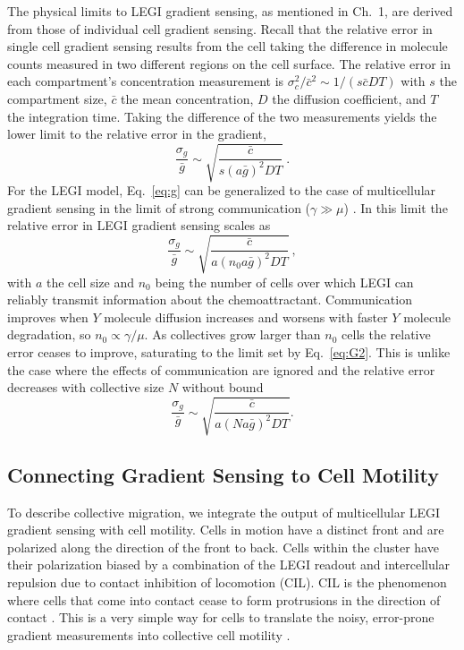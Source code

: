 The physical limits to LEGI gradient sensing, as mentioned in Ch.\ 1, are derived from those of individual cell gradient sensing. Recall that the relative error in single cell gradient sensing results from the cell taking the difference in molecule counts measured in two different regions on the cell surface. The relative error in each compartment’s concentration measurement is
$\sigma^2_c / \bar{c}^2 \sim 1 / (s\bar{c}DT)$
with $s$ the compartment size, $\bar{c}$ the mean concentration, $D$ the diffusion coefficient, and $T$ the integration time.
Taking the difference of the two measurements yields the lower limit to the relative error in the gradient,
\begin{equation} \label{eq:g}
    \frac{\sigma_g}{\bar{g}} \sim \sqrt{\frac{\bar{c}}{s(a\bar{g})^2DT}} \ .
\end{equation}
For the LEGI model, Eq.\ \ref{eq:g} can be generalized to the case of multicellular gradient sensing in the limit of strong communication ($\gamma \gg \mu$) \cite{mugler2016limits}.
In this limit the relative error in LEGI gradient sensing scales as
\begin{equation} \label{eq:G2}
    \frac{\sigma_g}{\bar{g}} \sim \sqrt{\frac{\bar{c}}{a(n_0a\bar{g})^2DT}} \ ,
\end{equation}
with $a$ the cell size and $n_0$ being the number of cells over which LEGI can reliably transmit information about the chemoattractant.
Communication improves when $Y$ molecule diffusion increases and worsens with faster $Y$ molecule degradation, so
$n_0 \propto \gamma / \mu$.
As collectives grow larger than $n_0$ cells the relative error ceases to improve, saturating to the limit set by Eq.\ \ref{eq:G2}. This is unlike the case where the effects of communication are ignored and the relative error decreases with collective size $N$ without bound
\begin{equation} \label{eq:G1}
    \frac{\sigma_g}{\bar{g}} \sim \sqrt{\frac{\bar{c}}{a(Na\bar{g})^2DT}}.
\end{equation}

\subsection{Connecting Gradient Sensing to Cell Motility}

To describe collective migration, we integrate the output of multicellular LEGI gradient sensing with cell motility. Cells in motion have a distinct front and are polarized along the direction of the front to back. Cells within the cluster have their polarization biased by a combination of the LEGI readout and intercellular repulsion due to contact inhibition of locomotion (CIL). CIL is the phenomenon where cells that come into contact cease to form protrusions in the direction of contact \cite{mayor2010keeping}. This is a very simple way for cells to translate the noisy, error-prone gradient measurements into collective cell motility \cite{camley2016emergent,malet2015collective,theveneau2010collective}.

